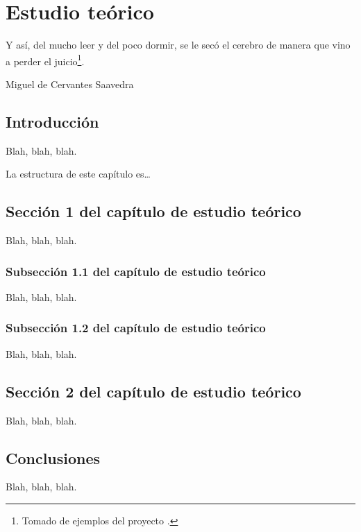 
\chapter{Estudio teórico}
\label{cha:estudio-teorico}

\begin{FraseCelebre}
  \begin{Frase}
    Y así, del mucho leer y del poco dormir, se le secó el cerebro de
    manera que vino a perder el juicio\footnote{Tomado de ejemplos del
      proyecto \texis{}.}.
  \end{Frase}
  \begin{Fuente}
    Miguel de Cervantes Saavedra
  \end{Fuente}
\end{FraseCelebre}


\section{Introducción}
\label{sec:theory-introduction}

Blah, blah, blah.

La estructura de este capítulo es\ldots


\section{Sección 1 del capítulo de estudio teórico}
\label{sec:theory-1}

Blah, blah, blah.


\subsection{Subsección 1.1 del capítulo de estudio teórico}
\label{sec:theory-11}

Blah, blah, blah.


\subsection{Subsección 1.2 del capítulo de estudio teórico}
\label{sec:theory-12}

Blah, blah, blah.


\section{Sección 2 del capítulo de estudio teórico}
\label{sec:theory-2}

Blah, blah, blah.




\section{Conclusiones}
\label{sec:theory-conclusions}

Blah, blah, blah.


